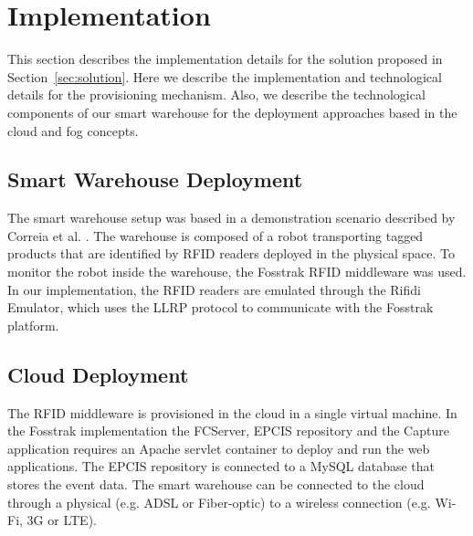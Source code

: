 
\section{Implementation}
\label{sec:implementation}
This section describes the implementation details for the solution proposed in Section~\ref{sec:solution}.
Here we describe the implementation and technological details for the provisioning mechanism. Also, we
describe the technological components of our smart warehouse for the deployment approaches based in
the cloud and fog concepts.

\subsection{Smart Warehouse Deployment}
\label{sub:impl_smart_place}
The smart warehouse setup was based in a demonstration scenario described by Correia et al. \cite{correiaalpharfid}.
The warehouse is composed of a robot transporting tagged products that are identified by \gls{RFID} readers
deployed in the physical space. To monitor the robot inside the warehouse, the Fosstrak \gls{RFID} middleware
was used. In our implementation, the \gls{RFID} readers are emulated through the Rifidi Emulator, which
uses the \gls{LLRP} protocol to communicate with the Fosstrak platform.

\subsection{Cloud Deployment}
\label{sub:imp_smart_warehouse_cloud}

The \gls{RFID} middleware is provisioned in the cloud in a single virtual machine. In the
Fosstrak implementation the \gls{FCServer}, \gls{EPCIS} repository and the Capture application
requires an Apache servlet container to deploy and run the web applications. The \gls{EPCIS}
repository is connected to a MySQL database that stores the event data. The smart warehouse can be
connected to the cloud through a physical (e.g. \gls{ADSL} or Fiber-optic) to a wireless
connection (e.g. Wi-Fi, 3G or \gls{LTE}).

